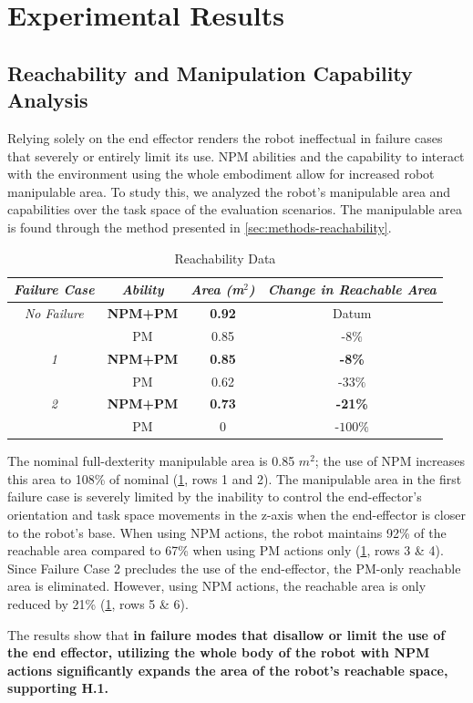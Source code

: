 \section{Experimental Results}\label{sec:eval}

\subsection{Reachability and Manipulation Capability Analysis}\label{sec:reach_anls}
Relying solely on the end effector renders the robot ineffectual in failure cases that severely or entirely limit its use.
NPM abilities and the capability to interact with the environment using the whole embodiment allow for increased robot manipulable area. To study this, we analyzed the robot's manipulable area and capabilities over the task space of the evaluation scenarios.
The manipulable area is found through the method presented in \cref{sec:methods-reachability}.

\begin{table}[]
\centering
\begin{tabular}{@{}cccc@{}}
\toprule
\textit{\textbf{Failure Case}} & \textit{\textbf{Ability}} & \textit{\textbf{Area (m$^2$)}} & \textit{\textbf{Change in Reachable Area}}\\ \midrule
\textit{No Failure} & \textbf{NPM+PM} & \textbf{0.92} & Datum \\ %
 & PM     & 0.85 & -$8\%$ \\ \midrule
\textit{1}       & \textbf{NPM+PM} & \textbf{0.85} & \textbf{-8\%} \\ %
      & PM     & 0.62 & -$33\%$ \\ \midrule
\textit{2}       & \textbf{NPM+PM} & \textbf{0.73} & \textbf{-21\%}  \\ %
     & PM     & 0 & -$100\%$      \\ \bottomrule
\end{tabular}
\caption{Reachability Data \vspace{-15pt}}
\label{tab:reachability}
\end{table}

The nominal full-dexterity manipulable area is 0.85 $m^2$; the use of NPM increases this area to 108\% of nominal (\cref{tab:reachability}, rows 1 and 2). The manipulable area in the first failure case is severely limited by the inability to control the end-effector's orientation and task space movements in the z-axis when the end-effector is closer to the robot's base. When using NPM actions, the robot maintains 92\% of the reachable area compared to 67\% when using PM actions only (\cref{tab:reachability}, rows 3 \& 4). Since Failure Case 2 precludes the use of the end-effector, the PM-only reachable area is eliminated. However, using NPM actions, the reachable area is only reduced by 21\% (\cref{tab:reachability}, rows 5 \& 6).

The results show that \textbf{in failure modes that disallow or limit the use of the end effector, utilizing the whole body of the robot with NPM actions significantly expands the area of the robot's reachable space, supporting H.1.}